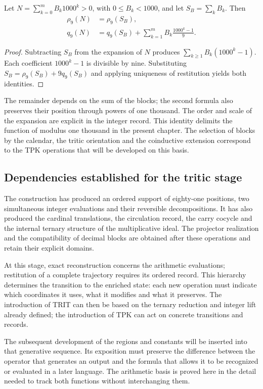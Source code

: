 \begin{bloqueindivisible}
\begin{corolario}
\label{cor:app-bloques}
Let $N=\sum_{k=0}^{m}B_k1000^k>0$, with $0\leq B_k<1000$, and let $S_B=\sum_kB_k$. Then
\begin{align}
 \rho_9(N)&=\rho_9(S_B),\\
 q_9(N)&=q_9(S_B)+
 \sum_{k=1}^{m}B_k\frac{1000^k-1}{9}.
 \label{eq:app-blocks-complete}
\end{align}
\end{corolario}

\begin{proof}
Subtracting $S_B$ from the expansion of $N$ produces $\sum_{k\geq1}B_k(1000^k-1)$. Each coefficient $1000^k-1$ is divisible by nine. Substituting $S_B=\rho_9(S_B)+9q_9(S_B)$ and applying uniqueness of restitution yields both identities.
\end{proof}
\end{bloqueindivisible}

The remainder depends on the sum of the blocks; the second formula also preserves their position through powers of one thousand. The order and scale of the expansion are explicit in the integer record. This identity delimits the function of modulus one thousand in the present chapter. The selection of blocks by the calendar, the tritic orientation and the coinductive extension correspond to the TPK operations that will be developed on this basis.

\subsection{Dependencies established for the tritic stage}
\label{sec:app-dependencias}

The construction has produced an ordered support of eighty-one positions, two simultaneous integer evaluations and their reversible decompositions. It has also produced the cardinal translations, the circulation record, the carry cocycle and the internal ternary structure of the multiplicative ideal. The projector realization and the compatibility of decimal blocks are obtained after these operations and retain their explicit domains.

At this stage, exact reconstruction concerns the arithmetic evaluations; restitution of a complete trajectory requires its ordered record. This hierarchy determines the transition to the enriched state: each new operation must indicate which coordinates it uses, what it modifies and what it preserves. The introduction of TRIT can then be based on the ternary reduction and integer lift already defined; the introduction of TPK can act on concrete transitions and records.

The subsequent development of the regions and constants will be inserted into that generative sequence. Its exposition must preserve the difference between the operator that generates an output and the formula that allows it to be recognized or evaluated in a later language. The arithmetic basis is proved here in the detail needed to track both functions without interchanging them.
